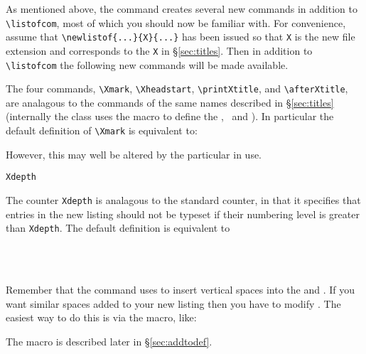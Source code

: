     As mentioned above, the \cmd{\newlistof} command creates several 
new commands in addition to \verb?\listofcom?, most of which you should 
now be familiar with. For convenience,
assume that \verb?\newlistof{...}{X}{...}? has been issued so that
\texttt{X} is the new file extension and corresponds to the \texttt{X} in
\S\ref{sec:titles}. Then in addition to \verb?\listofcom? the following 
new commands will be made available.

 The four commands, \verb?\Xmark?, 
 \verb?\Xheadstart?, 
\verb?\printXtitle?, and
\verb?\afterXtitle?, 
are analagous to the commands of the same names
described in \S\ref{sec:titles} (internally the class uses
the \cmd{\newlistof} macro to define the \toc, \lof\ and \lot). 
In particular the default definition of \verb?\Xmark? is equivalent to:
\begin{lcode}
\newcommand{\Xmark}{\markboth{listofname}{listofname}}
\end{lcode}
However, this may well be altered by the particular \cmd{\pagestyle} in
use.

\begin{syntax}
\verb?Xdepth? \\
\end{syntax}
 The counter \verb?Xdepth? is analagous to the standard
  counter, in that it specifies that entries
 in the new listing should not be typeset if their numbering level 
 is greater
 than \verb?Xdepth?. The default definition is equivalent to
\begin{lcode}
\setcounter{Xdepth}{1}
\end{lcode}

\begin{syntax}
\cmd{\insertchapterspace} \\
\cmd{\addtodef} \\
\end{syntax}
Remember that the \cmd{\chapter} command uses \cmd{\insertchapterspace}
to insert vertical spaces into the \lof{} and \lot. If you want similar
spaces added to your new listing then you have to modify
\cmd{\insertchapterspace}. The easiest way to do this is via
the \cmd{\addtodef} macro, like:
\begin{lcode}
\addtodef{\insertchapterspace}{}%
  {}
\end{lcode}
The \cmd{\addtodef} macro is described later in \S\ref{sec:addtodef}.

